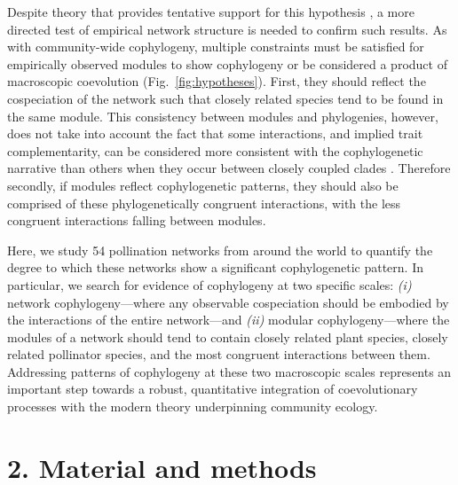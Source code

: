 \documentclass{article}
\begin{document}
	Despite theory that provides tentative support for this hypothesis \citep{Nuismer2013}, a more directed test of empirical network structure is needed to confirm such results. As with community-wide cophylogeny, multiple constraints must be satisfied for empirically observed modules to show cophylogeny or be considered a product of macroscopic coevolution (Fig.\ \ref{fig:hypotheses}). First, they should reflect the cospeciation of the network such that closely related species tend to be found in the same module. This consistency between modules and phylogenies, however, does not take into account the fact that some interactions, and implied trait complementarity, can be considered more consistent with the cophylogenetic narrative than others when they occur between closely coupled clades \citep{Legendre2002, Page2003, Segraves2010, Balbuena2013}. Therefore secondly, if modules reflect cophylogenetic patterns, they should also be comprised of these phylogenetically congruent interactions, with the less congruent interactions falling between modules.
	
	Here, we study 54 pollination networks from around the world to quantify the degree to which these networks show a significant cophylogenetic pattern. In particular, we search for evidence of cophylogeny at two specific scales: \emph{(i)} network cophylogeny---where any observable cospeciation should be embodied by the interactions of the entire network---and \emph{(ii)} modular cophylogeny---where the modules of a network should tend to contain closely related plant species, closely related pollinator species, and the most congruent interactions between them. Addressing patterns of cophylogeny at these two macroscopic scales represents an important step towards a robust, quantitative integration of coevolutionary processes with the modern theory underpinning community ecology.
	
\section*{2. Material and methods}
\end{document}

